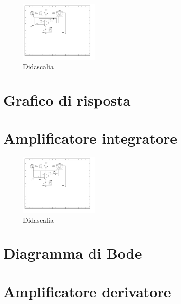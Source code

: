 \documentclass[journal]{IEEEtran}
\begin{document}
\begin{figure}[H]%
\begin {center}
\includegraphics[width=0.35\textwidth]{sch-simulations/output/OPA-log.pdf}
\caption{Didascalia}
\label{fig:oscilloscope}
\end {center}
\end{figure}

\section{Grafico di risposta}


\section{Amplificatore integratore} %

\begin{figure}[H]%
\begin {center}
\includegraphics[width=0.35\textwidth]{sch-simulations/output/OPA-integratore.pdf}
\caption{Didascalia}
\label{fig:oscilloscope}
\end {center}
\end{figure}

\section{Diagramma di Bode}


\section{Amplificatore derivatore} %
\end{document}
